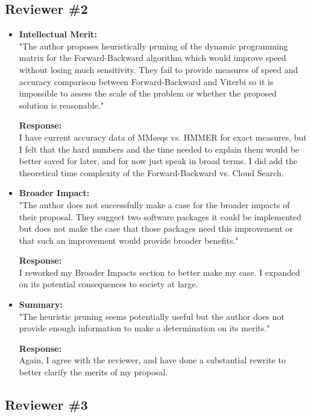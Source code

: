 \documentclass{article}
\begin{document}
	\subsection{Reviewer \#2}
	
	\begin{itemize}
		\item 
			\textbf{Intellectual Merit:} \\
			"The author proposes heuristically pruning of the dynamic programming matrix for the Forward-Backward algorithm which would improve speed without losing much sensitivity.  They fail to provide measures of speed and accuracy comparison between Forward-Backward and Viterbi so it is impossible to assess the scale of the problem or whether the proposed solution is reasonable."
			
			\textbf{Response:} \\
			I have current accuracy data of MMseqs vs. HMMER for exact measures, but I felt that the hard numbers and the time needed to explain them would be better saved for later, and for now just speak in broad terms.  I did add the theoretical time complexity of the Forward-Backward vs. Cloud Search.
		
		\item 
			\textbf{Broader Impact:} \\
			"The author does not successfully make a case for the broader impacts of their proposal.  They suggect two software packages it could be implemented but does not make the case that those packages need this improvement or that such an improvement would provide broader benefits."
			
			\textbf{Response:} \\
			I reworked my Broader Impacts section to better make my case.  I expanded on its potential consequences to society at large.  
		
		\item
			\textbf{Summary:} \\
			"The heuristic pruning seems potentially useful but the author does not provide enough information to make a determination on its merits."
			
			\textbf{Response:} \\
			Again, I agree with the reviewer, and have done a substantial rewrite to better clarify the merits of my proposal.
		
	\end{itemize}

	\subsection{Reviewer \#3}
\end{document}
